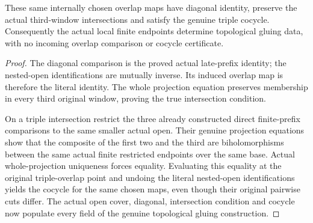\begin{theorem}
\label{hir:actual-locally-finite-history-overlap-cocycle-gluing}
\leanok
These same internally chosen overlap maps have diagonal identity, preserve
the actual third-window intersections and satisfy the genuine triple cocycle.
Consequently the actual local finite endpoints determine topological gluing
data, with no incoming overlap comparison or cocycle certificate.
\end{theorem}
\begin{proof}
The diagonal comparison is the proved actual late-prefix identity; the
nested-open identifications are mutually inverse. Its induced overlap map
is therefore the literal identity. The whole projection equation preserves
membership in every third original window, proving the true intersection
condition.

On a triple intersection restrict the three already constructed direct
finite-prefix comparisons to the same smaller actual open. Their genuine
projection equations show that the composite of the first two and the third
are biholomorphisms between the same actual finite restricted endpoints
over the same base. Actual whole-projection uniqueness forces equality.
Evaluating this equality at the original triple-overlap point and undoing
the literal nested-open identifications yields the cocycle for the same
chosen maps, even though their original pairwise cuts differ. The actual
open cover, diagonal, intersection condition and cocycle now populate every
field of the genuine topological gluing construction.
\end{proof}
